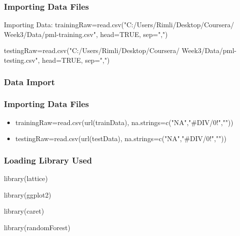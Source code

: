 \documentclass{beamer}
\begin{document}

\begin{frame}[fragile]
\frametitle{Importing Data Files}
\begin{itemize}
\begin{block}{Importing Data:}\newline
trainingRaw=read.csv("C:/Users/Rimli/Desktop/Coursera/
Week3/Data/pml-training.csv", head=TRUE, sep=",")\newline

\linebreak[2]
testingRaw=read.csv("C:/Users/Rimli/Desktop/Coursera/
Week3/Data/pml-testing.csv", head=TRUE, sep=",")

\end{block}
\end{itemize}
\end{frame}


\begin{frame}[fragile]
\frametitle{Data Import}
\end{frame}



\begin{frame}[fragile]
\frametitle{Importing Data Files}
\begin{itemize}
\item trainingRaw=read.csv(url(trainData), na.strings=c("NA","\#DIV/0!",""))\\

\item testingRaw=read.csv(url(testData), na.strings=c("NA","\#DIV/0!",""))

\end{itemize}
\end{frame}



\begin{frame}[fragile]
\frametitle{Loading Library Used}
\begin{itemize}
\begin{block}
{\item library(lattice)\newline
\item library(ggplot2)\newline
\item library(caret)\newline
\item library(randomForest)}

\end{block}
\end{itemize}
\end{frame}
\end{document}
